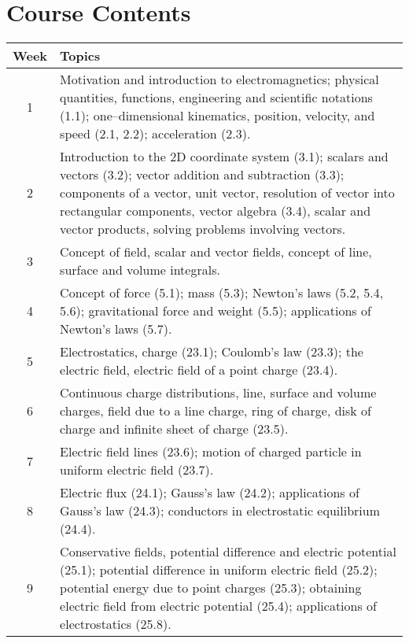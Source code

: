 \documentclass[12pt,a4paper]{article}
\begin{document}
\section{Course Contents}
\begin{center}
\vspace{-0.5cm}
	\begin{longtable}{|c|p{13cm}|}
	\hline \hline
		\rule{0pt}{2.6ex} \textbf{Week} & \textbf{Topics}\\
		\hline
		1 \rule{0pt}{2.6ex} & Motivation and introduction to electromagnetics; physical quantities, functions, engineering and scientific notations (1.1); one--dimensional kinematics, position, velocity, and speed (2.1, 2.2); acceleration (2.3).\\
		\hline
		2 \rule{0pt}{2.6ex} & Introduction to the 2D coordinate system (3.1); scalars and vectors (3.2); vector addition and subtraction (3.3); components of a vector, unit vector, resolution of vector into rectangular components, vector algebra (3.4), scalar and vector products, solving problems involving vectors.\\
		\hline
		3 \rule{0pt}{2.6ex} & Concept of field, scalar and vector fields, concept of line, surface and volume integrals.\\
		\hline
		4 \rule{0pt}{2.6ex} & Concept of force (5.1); mass (5.3); Newton's laws (5.2, 5.4, 5.6); gravitational force and weight (5.5); applications of Newton's laws (5.7).\\
		\hline
		5 \rule{0pt}{2.6ex} & Electrostatics, charge (23.1); Coulomb's law (23.3); the electric field, electric field of a point charge (23.4).\\
		\hline
		6 \rule{0pt}{2.6ex} & Continuous charge distributions, line, surface and volume charges,  field due to a line charge, ring of charge, disk of charge and infinite sheet of charge (23.5).\\
		\hline
		7 \rule{0pt}{2.6ex} & Electric field lines (23.6); motion of charged particle in uniform electric field (23.7).\\
		\hline
		8 \rule{0pt}{2.6ex} & Electric flux (24.1); Gauss's law (24.2); applications of Gauss's law (24.3); conductors in electrostatic equilibrium (24.4).\\
		\hline
		9 \rule{0pt}{2.6ex} & Conservative fields, potential difference and electric potential (25.1); potential difference in uniform electric field (25.2); potential energy due to point charges (25.3); obtaining electric field from electric potential (25.4); applications of electrostatics (25.8).\\

\end{longtable}
\end{center}
\end{document}
